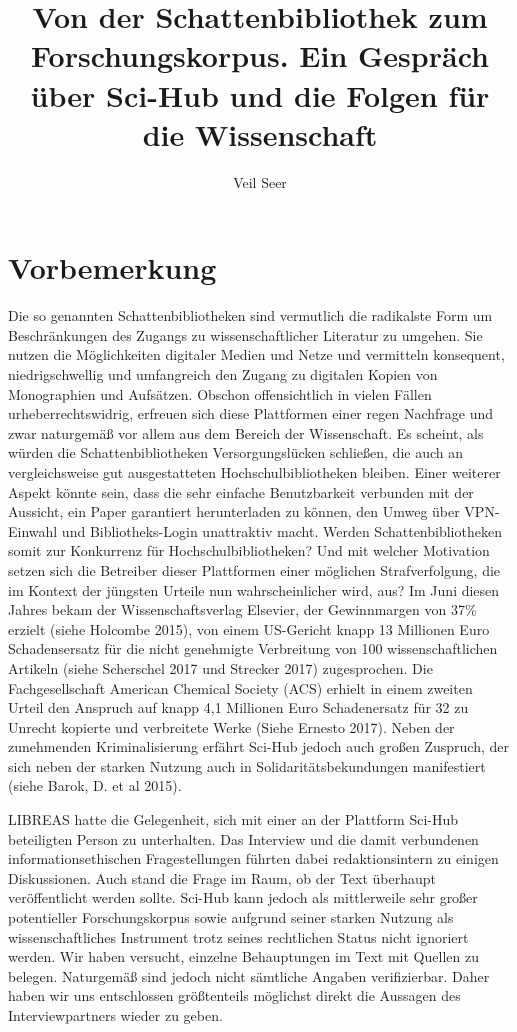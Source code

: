 \documentclass[a4paper,
fontsize=11pt,
oneside,
numbers=noperiodatend,
parskip=half-,
bibliography=totoc,
final
]{scrartcl}
\title{\LARGE{Von der Schattenbibliothek zum Forschungskorpus. Ein Gespräch über Sci-Hub und die Folgen für die Wissenschaft}} %
\author{Veil Seer} %
\date{}
\begin{document}
\maketitle
\thispagestyle{fancyplain} 


\hypertarget{vorbemerkung}{%
\section*{Vorbemerkung}\label{vorbemerkung}}

Die so genannten Schattenbibliotheken sind vermutlich die radikalste
Form um Beschränkungen des Zugangs zu wissenschaftlicher Literatur zu
umgehen. Sie nutzen die Möglichkeiten digitaler Medien und Netze und
vermitteln konsequent, niedrigschwellig und umfangreich den Zugang zu
digitalen Kopien von Monographien und Aufsätzen. Obschon offensichtlich
in vielen Fällen urheberrechtswidrig, erfreuen sich diese Plattformen
einer regen Nachfrage und zwar naturgemäß vor allem aus dem Bereich der
Wissenschaft. Es scheint, als würden die Schattenbibliotheken
Versorgungslücken schließen, die auch an vergleichsweise gut
ausgestatteten Hochschulbibliotheken bleiben. Einer weiterer Aspekt
könnte sein, dass die sehr einfache Benutzbarkeit verbunden mit der
Aussicht, ein Paper garantiert herunterladen zu können, den Umweg über
VPN-Einwahl und Bibliotheks-Login unattraktiv macht. Werden
Schattenbibliotheken somit zur Konkurrenz für Hochschulbibliotheken? Und
mit welcher Motivation setzen sich die Betreiber dieser Plattformen
einer möglichen Strafverfolgung, die im Kontext der jüngsten Urteile nun
wahrscheinlicher wird, aus? Im Juni diesen Jahres bekam der
Wissenschaftsverlag Elsevier, der Gewinnmargen von 37\% erzielt (siehe
Holcombe 2015), von einem US-Gericht knapp 13 Millionen Euro
Schadensersatz für die nicht genehmigte Verbreitung von 100
wissenschaftlichen Artikeln (siehe Scherschel 2017 und Strecker 2017)
zugesprochen. Die Fachgesellschaft American Chemical Society (ACS)
erhielt in einem zweiten Urteil den Anspruch auf knapp 4,1 Millionen
Euro Schadenersatz für 32 zu Unrecht kopierte und verbreitete Werke
(Siehe Ernesto 2017). Neben der zunehmenden Kriminalisierung erfährt
Sci-Hub jedoch auch großen Zuspruch, der sich neben der starken Nutzung
auch in Solidaritätsbekundungen manifestiert (siehe Barok, D. et al
2015).

LIBREAS hatte die Gelegenheit, sich mit einer an der Plattform Sci-Hub
beteiligten Person zu unterhalten. Das Interview und die damit
verbundenen informationsethischen Fragestellungen führten dabei
redaktionsintern zu einigen Diskussionen. Auch stand die Frage im Raum,
ob der Text überhaupt veröffentlicht werden sollte. Sci-Hub kann jedoch
als mittlerweile sehr großer potentieller Forschungskorpus sowie
aufgrund seiner starken Nutzung als wissenschaftliches Instrument trotz
seines rechtlichen Status nicht ignoriert werden. Wir haben versucht,
einzelne Behauptungen im Text mit Quellen zu belegen. Naturgemäß sind
jedoch nicht sämtliche Angaben verifizierbar. Daher haben wir uns
entschlossen größtenteils möglichst direkt die Aussagen des
Interviewpartners wieder zu geben.
\end{document}
